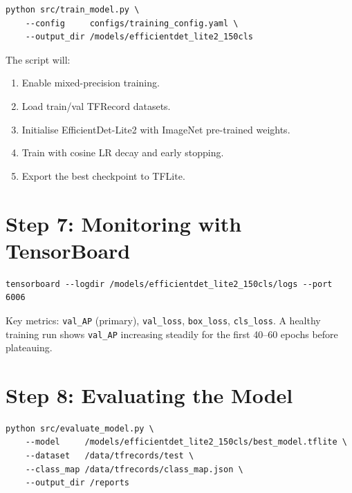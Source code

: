 \documentclass[11pt,a4paper]{article}
\begin{document}
\begin{lstlisting}[style=bash, caption={Start training}]
python src/train_model.py \
    --config     configs/training_config.yaml \
    --output_dir /models/efficientdet_lite2_150cls
\end{lstlisting}

The script will:
\begin{enumerate}[nosep]
    \item Enable mixed-precision training.
    \item Load train/val TFRecord datasets.
    \item Initialise EfficientDet-Lite2 with ImageNet pre-trained weights.
    \item Train with cosine LR decay and early stopping.
    \item Export the best checkpoint to TFLite.
\end{enumerate}

\section{Step 7: Monitoring with TensorBoard}

\begin{lstlisting}[style=bash, caption={Launch TensorBoard}]
tensorboard --logdir /models/efficientdet_lite2_150cls/logs --port 6006
\end{lstlisting}

Key metrics: \texttt{val\_AP} (primary), \texttt{val\_loss}, \texttt{box\_loss},
\texttt{cls\_loss}. A healthy training run shows \texttt{val\_AP} increasing
steadily for the first 40--60 epochs before plateauing.

\section{Step 8: Evaluating the Model}

\begin{lstlisting}[style=bash, caption={Run evaluation on the test split}]
python src/evaluate_model.py \
    --model     /models/efficientdet_lite2_150cls/best_model.tflite \
    --dataset   /data/tfrecords/test \
    --class_map /data/tfrecords/class_map.json \
    --output_dir /reports
\end{lstlisting}
\end{document}
